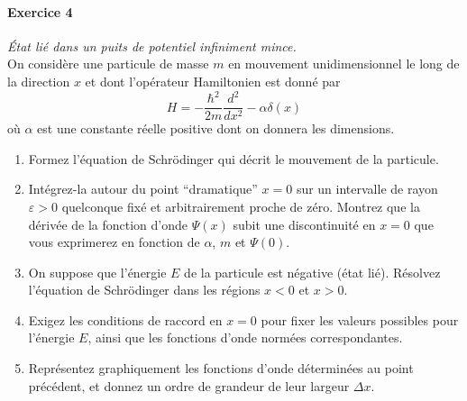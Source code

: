 \paragraph{Exercice 4} \textit{État lié dans un puits de potentiel infiniment mince.} \\
On considère une particule de masse $m$ en mouvement unidimensionnel le long de la direction $x$ et dont l'opérateur Hamiltonien est donné par
\begin{equation}
H = -\frac{\hbar^2}{2m} \frac{d^2}{dx^2} - \alpha \delta(x)
\end{equation}
où $\alpha$ est une constante réelle positive dont on donnera les dimensions.
\begin{enumerate}
\item Formez l'équation de Schrödinger qui décrit le mouvement de la particule. 
\item Intégrez-la autour du point ``dramatique'' $x=0$ sur un intervalle de rayon $\varepsilon >0$ quelconque fixé et arbitrairement proche de zéro. Montrez que la dérivée de la fonction d'onde $\Psi(x)$ subit une discontinuité en $x=0$ que vous exprimerez en fonction de $\alpha$, $m$ et $\Psi(0)$.
\item On suppose que l'énergie $E$ de la particule est négative (état lié). Résolvez l'équation de Schrödinger dans les régions $x<0$ et $x>0$.
\item Exigez les conditions de raccord en $x=0$ pour fixer les valeurs possibles pour l'énergie $E$, ainsi que les fonctions d'onde normées correspondantes.
\item Représentez graphiquement les fonctions d'onde déterminées au point précédent, et donnez un ordre de grandeur de leur largeur $\Delta x$. 
\end{enumerate}

